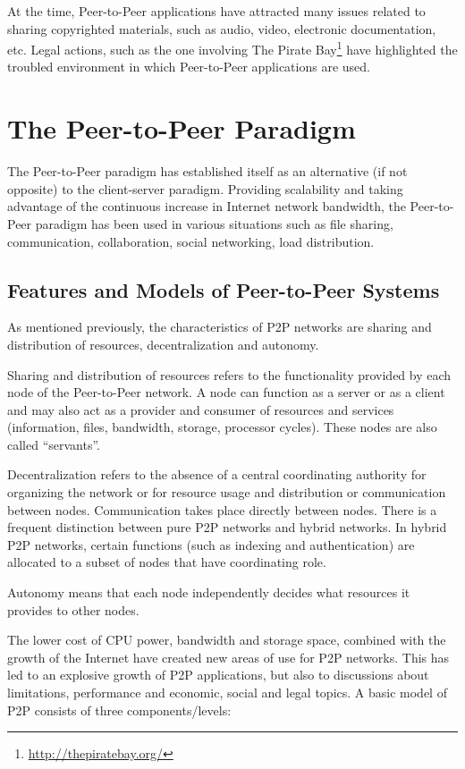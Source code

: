 At the time, Peer-to-Peer applications have attracted many issues related to
sharing copyrighted materials, such as audio, video, electronic documentation,
etc. Legal actions, such as the one involving The Pirate
Bay\footnote{\url{http://thepiratebay.org/}} have highlighted the troubled
environment in which Peer-to-Peer applications are used.

\section{The Peer-to-Peer Paradigm}
\label{sec:p2p-systems:paragigm}

The Peer-to-Peer paradigm has established itself as an alternative (if not
opposite) to the client-server paradigm. Providing scalability and taking
advantage of the continuous increase in Internet network bandwidth, the
Peer-to-Peer paradigm has been used in various situations such as file
sharing, communication, collaboration, social networking, load distribution.

\subsection{Features and Models of Peer-to-Peer Systems}

As mentioned previously, the characteristics of P2P networks are sharing and
distribution of resources, decentralization and autonomy.

Sharing and distribution of resources refers to the functionality provided by
each node of the Peer-to-Peer network. A node can function as a server or as a
client and may also act as a provider and consumer of resources and
services (information, files, bandwidth, storage, processor cycles). These
nodes are also called ``servants''.

Decentralization refers to the absence of a central coordinating authority for
organizing the network or for resource usage and distribution or communication
between nodes. Communication takes place directly between nodes. There is a
frequent distinction between pure P2P networks and hybrid networks. In
hybrid P2P networks, certain functions (such as indexing and authentication)
are allocated to a subset of nodes that have coordinating role.

Autonomy means that each node independently decides what resources it provides
to other nodes.

The lower cost of CPU power, bandwidth and storage space, combined with
the growth of the Internet have created new areas of use for P2P networks.
This has led to an explosive growth of P2P applications, but also to
discussions about limitations, performance and economic, social and legal
topics. A basic model of P2P consists of three components/levels:

